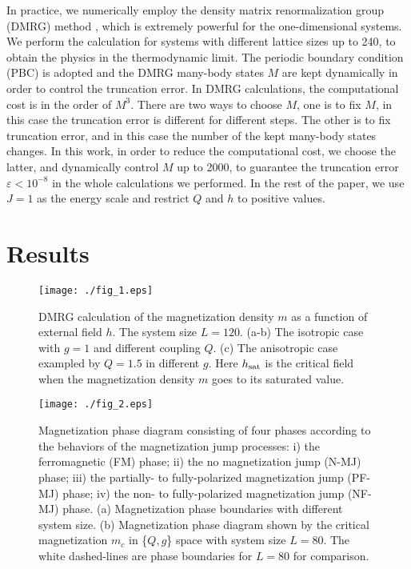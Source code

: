 \documentclass[article,10pt,onecolumn,superscriptaddress,floatfix]{revtex4}
\begin{document}
In practice, we numerically employ the density matrix renormalization group (DMRG) method {\cite{white1992, white1993}}, which is extremely powerful for the one-dimensional systems. We perform the calculation for systems with different lattice sizes up to 240, to obtain the physics in the thermodynamic limit. The periodic boundary condition (PBC) is adopted and the DMRG many-body states $M$ are kept dynamically \cite{Legeza2003} in order to control the truncation error. In DMRG calculations, the computational cost is in the order of $M^3$. There are two ways to choose $M$, one is to fix $M$, in this case the truncation error is different for different steps. The other is to fix truncation error, and in this case the number of the kept many-body states changes. In this work, in order to reduce the computational cost, we choose the latter, and dynamically control $M$ up to 2000, to guarantee the truncation error $\varepsilon<10^{-8}$ in the whole calculations we performed. 
In the rest of the paper, we use $J=1$ as the energy scale and restrict $Q$ and $h$ to positive values.

\section{Results}
\label{sec_3}

\begin{figure}[!tb] %
	\centering
	\texttt{[image: ./fig\_1.eps]}
	\caption{DMRG calculation of the magnetization density $m$ as a function of external field $h$. The system size $L=120$. (a-b) The isotropic case with $g=1$ and different coupling $Q$. (c) The anisotropic case exampled by $Q=1.5$ in different $g$. Here $h_{\rm sat}$ is the critical field when the magnetization density $m$ goes to its saturated value. }
	\label{fig:mz}
\end{figure}

\begin{figure}[!tb] %
	\centering
	\texttt{[image: ./fig\_2.eps]}
	\caption{ Magnetization phase diagram consisting of four phases according to the behaviors of the magnetization jump processes: i) the ferromagnetic (FM) phase; ii) the no magnetization jump (N-MJ) phase; iii) the partially- to fully-polarized magnetization jump (PF-MJ) phase; iv) the non- to fully-polarized magnetization jump (NF-MJ) phase. (a) Magnetization phase boundaries with different system size. (b) Magnetization phase diagram shown by the critical magnetization $m_c$ in \{$Q,g$\} space with system size $L=80$. The white dashed-lines are phase boundaries for $L=80$ for comparison.}
	\label{fig:phase_diag}
\end{figure}
\end{document}
